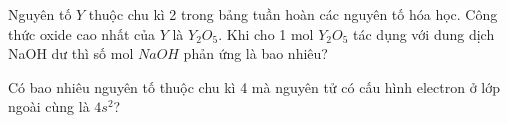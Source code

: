 \documentclass[Main.tex]{subfiles}
\begin{document}
		\begin{bt}
			Nguyên tố \(Y \) thuộc chu kì 2 trong bảng tuần hoàn các nguyên tố hóa học. Công thức oxide cao nhất của \(Y \) là \(Y_2O_5 \). Khi cho 1 mol \(Y_2O_5 \) tác dụng với dung dịch NaOH dư thì số mol \(NaOH \) phản ứng là bao nhiêu?
			\shortans{}
			\loigiai{}
		\end{bt}
		
		\begin{bt}
			Có bao nhiêu nguyên tố thuộc chu kì 4 mà nguyên tử có cấu hình electron ở lớp ngoài cùng là \(4s^2 \)?
			\shortans{}
			\loigiai{}
		\end{bt}
\end{document}
